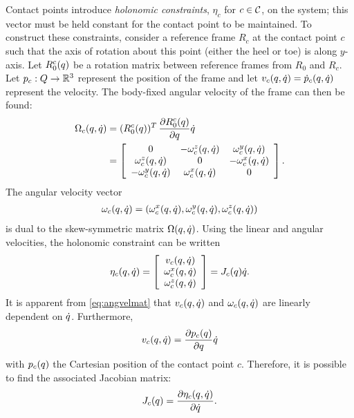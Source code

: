Contact points introduce {\it holonomic constraints}, $\eta_{c}$ for $c \in \mathcal{C}$,
on the system; this vector must be held constant for the contact point to be
maintained.
%
To construct these constraints, consider a reference frame $R_{c}$ at the
contact point $c$ such that the axis of rotation about this point (either the
heel or toe) is along $y$-axis.
%
Let $R_0^c(q)$ be a rotation matrix between reference frames from $R_{0}$ and
$R_{c}$.
%
Let $p_{c} : Q \to \mathbb{R}^{3}$ represent the position of the frame and let $v_{c}(q, \dot{q}) = {\dot p}_{c}(q, \dot{q})$ represent the velocity.
%
The body-fixed angular velocity of the frame can then be found:
%
\begin{align}
  \label{eq:angvelmat}
  \Omega_{c}(q, \dot{q}) &= (R_{0}^{c}(q))^{T} \, \frac{\partial{R_{0}^{c}(q)}}{\partial{q}} \dot{q}\\
  \nonumber
  &= \left[\begin{array}{c c c}
      0 & -\omega_{c}^{z}(q, \dot{q}) & \omega_{c}^{y}(q, \dot{q})\\
      \omega_{c}^{z}(q, \dot{q}) & 0 & -\omega_{c}^{x}(q, \dot{q})\\
      -\omega_{c}^{y}(q, \dot{q}) & \omega_{c}^{x}(q, \dot{q}) & 0
    \end{array}\right].
\end{align}
The angular velocity vector
\begin{align}
  \omega_{c}(q, \dot{q}) = (\omega_{c}^{x}(q, \dot{q}), \omega_{c}^{y}(q, \dot{q}), \omega_{c}^{z}(q, \dot{q}))
\end{align}
is dual to the skew-symmetric matrix $\Omega(q, \dot{q})$.
%
Using the linear and angular velocities, the holonomic constraint can be written
\begin{align}
  \eta_{c}(q, \dot{q}) = \left[\begin{array}{c}
      v_{c}(q, \dot{q})\\
      \omega_{c}^{x}(q, \dot{q})\\
      \omega_{c}^{z}(q, \dot{q})
    \end{array}\right] =
  J_{c}(q) \dot{q}.
\end{align}
It is apparent from \eqref{eq:angvelmat} that $v_{c}(q, \dot{q})$ and
$\omega_{c}(q, \dot{q})$ are linearly dependent on $\dot{q}$.
%
Furthermore,
\begin{align*}
  v_{c}(q, \dot{q}) = \frac{\partial{p_{c}(q)}}{\partial{q}} \dot{q}
\end{align*}
with $p_{c}(q)$ the Cartesian position of the contact point $c$.
%
Therefore, it is possible to find the associated Jacobian matrix:
%
\begin{align*}
  J_{c}(q) = \frac{\partial{\eta_{c}(q, \dot{q})}}{\partial{\dot{q}}}.
\end{align*}

